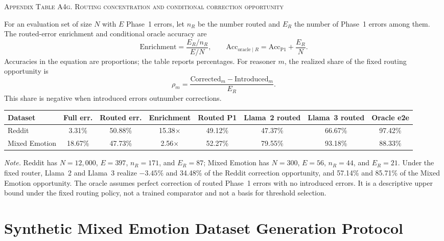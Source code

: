 \documentclass{ieeeaccess}
\begin{document}
\par\medskip
\noindent\textsc{Appendix Table A4g. Routing concentration and conditional correction opportunity}\par
\label{tab:appendix-a4g-routing-decomposition}
\smallskip
\footnotesize
For an evaluation set of size $N$ with $E$ Phase~1 errors, let $n_R$ be the number routed and $E_R$ the number of Phase~1 errors among them. The routed-error enrichment and conditional oracle accuracy are
\[
\mathrm{Enrichment}=\frac{E_R/n_R}{E/N},
\qquad
\mathrm{Acc}_{\mathrm{oracle}\mid R}=\mathrm{Acc}_{\mathrm{P1}}+\frac{E_R}{N}.
\]
Accuracies in the equation are proportions; the table reports percentages. For reasoner $m$, the realized share of the fixed routing opportunity is
\[
\rho_m=\frac{\mathrm{Corrected}_m-\mathrm{Introduced}_m}{E_R}.
\]
This share is negative when introduced errors outnumber corrections.
\par\smallskip
\footnotesize
\setlength{\tabcolsep}{1.5pt}
\renewcommand{\arraystretch}{1.15}
\noindent\begin{tabularx}{0.98\textwidth}{@{}l c c c c c c c@{}}
\toprule
Dataset & Full err. & Routed err. & Enrichment & Routed P1 & Llama~2 routed & Llama~3 routed & Oracle e2e \\
\midrule
Reddit & 3.31\% & 50.88\% & 15.38$\times$ & 49.12\% & 47.37\% & 66.67\% & 97.42\% \\
Mixed Emotion & 18.67\% & 47.73\% & 2.56$\times$ & 52.27\% & 79.55\% & 93.18\% & 88.33\% \\
\bottomrule
\end{tabularx}
\par\smallskip
\noindent\footnotesize\textit{Note.} Reddit has $N=12{,}000$, $E=397$, $n_R=171$, and $E_R=87$; Mixed Emotion has $N=300$, $E=56$, $n_R=44$, and $E_R=21$. Under the fixed router, Llama~2 and Llama~3 realize $-3.45\%$ and 34.48\% of the Reddit correction opportunity, and 57.14\% and 85.71\% of the Mixed Emotion opportunity. The oracle assumes perfect correction of routed Phase~1 errors with no introduced errors. It is a descriptive upper bound under the fixed routing policy, not a trained comparator and not a basis for threshold selection.\normalsize


\par\medskip
{}
\section{Synthetic Mixed Emotion Dataset Generation Protocol}
\end{document}
